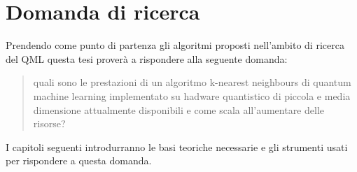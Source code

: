 \section{Domanda di ricerca}

Prendendo come punto di partenza gli algoritmi proposti nell'ambito di ricerca del \ac{QML} 
questa tesi proverà a rispondere alla seguente domanda:
\begin{quote}
    quali sono le prestazioni di un algoritmo k-nearest neighbours di quantum 
    machine learning implementato su hadware quantistico di piccola e media dimensione 
    attualmente disponibili e come scala all'aumentare delle risorse?
\end{quote}
I capitoli seguenti introdurranno le basi teoriche necessarie e gli strumenti usati 
per rispondere a questa domanda. 

